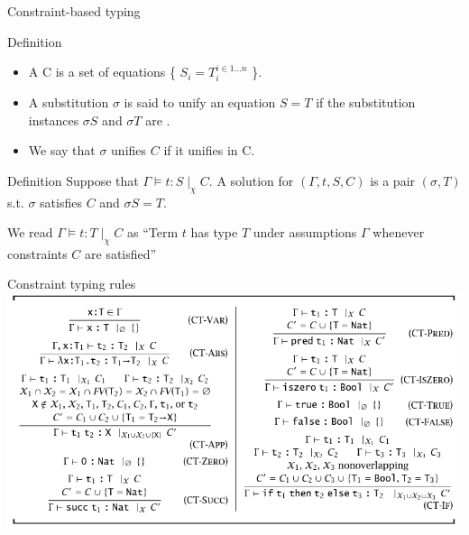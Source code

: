\documentclass[usenames,dvipsnames]{beamer}
\begin{document}
\begin{frame}{Constraint-based typing}
\begin{block}{Definition}
\begin{itemize}
\item A  C is a set of equations \{ $S_i = T_i^{i \in 1...n} $ \}.
\item A substitution $\sigma$ is said to \alert{unify} an equation $S=T$ if the substitution instances $\sigma S$ and $\sigma T$ are .
\item  We say that $\sigma$ unifies $C$ if it unifies  in C.
\end{itemize}
\end{block}

\begin{block}{Definition}
Suppose that $\Gamma \models t: S \mid_{\chi}C.$ A solution for $(\Gamma, t, S, C)$ is a pair $(\sigma, T)$ s.t. $\sigma$ satisfies $C$ and $\sigma S= T$.
\end{block}
 We read $\Gamma \models t :T \mid_\chi C$ as ``Term $t$ has type $T$ under assumptions $\Gamma$ whenever constraints $C$ are satisfied''
\end{frame}

\begin{frame}{Constraint typing rules}
\includegraphics[scale=0.4]{img/rules}
\end{frame}
\end{document}
